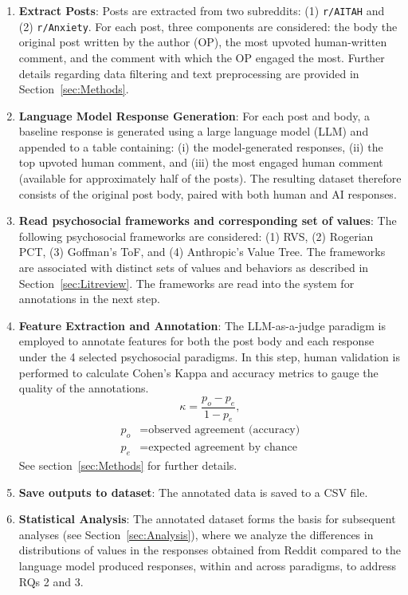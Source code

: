 \begin{enumerate}
    \item \textbf{Extract Posts}: Posts are extracted from two subreddits: (1) \texttt{r/AITAH} and (2) \texttt{r/Anxiety}. For each post, three components are considered: the body the original post written by the author (OP), the most upvoted human-written comment, and the comment with which the OP engaged the most. Further details regarding data filtering and text preprocessing are provided in Section~\ref{sec:Methods}.
    \item \textbf{Language Model Response Generation}: For each post and body, a baseline response is generated using a large language model (LLM) and appended to a table containing: (i) the model-generated responses, (ii) the top upvoted human comment, and (iii) the most engaged human comment (available for approximately half of the posts). The resulting dataset therefore consists of the original post body, paired with both human and AI responses.
    \item \textbf{Read psychosocial frameworks and corresponding set of values}: The following psychosocial frameworks are considered: (1) RVS, (2) Rogerian PCT, (3) Goffman’s ToF, and (4) Anthropic’s Value Tree. The frameworks are associated with distinct sets of values and behaviors as described in Section~\ref{sec:Litreview}. The frameworks are read into the system for annotations in the next step.
    \item \textbf{Feature Extraction and Annotation}: The LLM-as-a-judge paradigm \cite{zheng-et-al} is employed to annotate features for both the post body and each response under the 4 selected psychosocial paradigms. In this step, human validation is performed to calculate Cohen's Kappa and accuracy metrics to gauge the quality of the annotations.
    \[
    \kappa = \frac{p_o - p_e}{1 - p_e},
    \]
    \[
    \begin{aligned}
    p_o &= \text{observed agreement (accuracy)} \\
    p_e &= \text{expected agreement by chance}
    \end{aligned}
    \]
    See section~\ref{sec:Methods} for further details.
    \item \textbf{Save outputs to dataset}: The annotated data is saved to a CSV file.
    \item \textbf{Statistical Analysis}: The annotated dataset forms the basis for subsequent analyses (see Section~\ref{sec:Analysis}), where we analyze the differences in distributions of values in the responses obtained from Reddit compared to the language model produced responses, within and across paradigms, to address RQs 2 and 3.
\end{enumerate}

